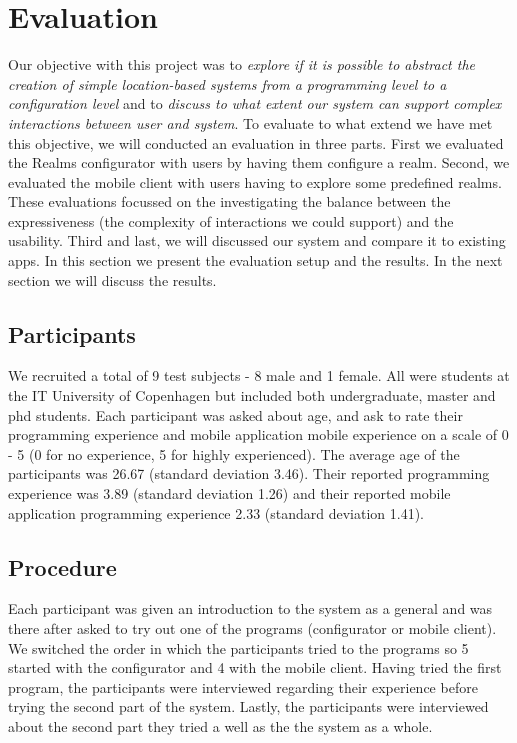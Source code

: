 \section{Evaluation}
\label{sec.eval}
Our objective with this project was to \emph{explore if it is possible to abstract the creation of simple location-based systems from a programming level to a configuration level} and to \emph{discuss to what extent our system can support complex interactions between user and system}. To evaluate to what extend we have met this objective, we will conducted an evaluation in three parts. First we evaluated the Realms configurator with users by having them configure a realm. Second, we evaluated the mobile client with users having to explore some predefined realms. These evaluations focussed on the investigating the balance between the expressiveness (the complexity of interactions we could support) and the usability.  Third and last, we will discussed our system and compare it to existing apps. In this section we present the evaluation setup and the results. In the next section we will discuss the results.

\subsection{Participants} %
\label{sub:participants}
We recruited a total of 9 test subjects - 8 male and 1 female. All were students at the IT University of Copenhagen but included both undergraduate, master and phd students. Each participant was asked about age, and ask to rate their programming experience and mobile application mobile experience on a scale of 0 - 5 (0 for no experience, 5 for highly experienced). The average age of the participants was 26.67 (standard deviation 3.46). Their reported programming experience was 3.89 (standard deviation 1.26) and their reported mobile application programming experience 2.33 (standard deviation 1.41). 

\subsection{Procedure} %
\label{sub:procedure}
Each participant was given an introduction to the system as a general and was there after asked to try out one of the programs (configurator or mobile client). We switched the order in which the participants tried to the programs so 5 started with the configurator and 4 with the mobile client. Having tried the first program, the participants were interviewed regarding their experience before trying the second part of the system. Lastly, the participants were interviewed about the second part they tried a well as the the system as a whole.  

